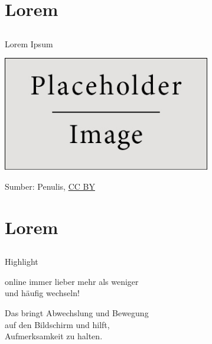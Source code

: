 \documentclass{beamer}
\begin{document}
\section{Lorem}
\subsection*{}


\begin{frame}{Lorem Ipsum}
	\small \lipsum[1][1-2]


	\begin{center}
		\includegraphics[height=5cm]{figures/placeholder}

		{\tiny \textcolor{digiPH_darkorange}{Sumber: Penulis, \href{https://creativecommons.org/licenses/by/3.0/at/}{CC BY}}}
	\end{center}
\end{frame}



\section{Lorem}
\subsection*{}

\begin{frame}{Highlight}
	\begin{center}
		\Large
		online immer lieber {\Huge mehr} als weniger\\
		und häufig wechseln!
	\end{center}
	\pause
	\begin{center}
		\Large
		Das bringt Abwechslung und Bewegung\\auf
        den Bildschirm und hilft,\\
        {\Huge Aufmerksamkeit} zu {\Huge halten}.
	\end{center}
\end{frame}
\end{document}
